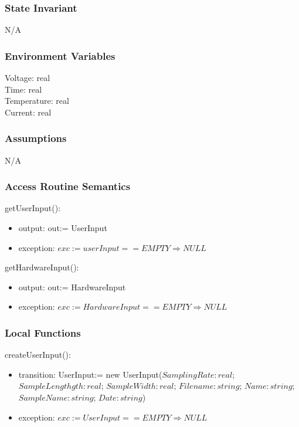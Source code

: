 \documentclass[12pt, titlepage]{article}
\begin{document}
\subsubsection{State Invariant}

N/A

\subsubsection{Environment Variables}
Voltage: real \\
Time: real \\
Temperature: real \\
Current: real 


\subsubsection{Assumptions}
N/A

\subsubsection{Access Routine Semantics}

\noindent getUserInput():
\begin{itemize}
\item output: out:= UserInput
\item exception: $exc:= userInput == EMPTY \Rightarrow NULL$
\end{itemize}

\noindent getHardwareInput():
\begin{itemize}
  \item output: out:= HardwareInput
  \item exception: $exc:= HardwareInput == EMPTY \Rightarrow NULL$
\end{itemize}

\subsubsection{Local Functions}

createUserInput(): 
\begin{itemize}
  \item transition: UserInput:= new UserInput($SamplingRate: real$; $SampleLengthgth: real$; $SampleWidth: real$; $Filename: string$; $Name: string$; $SampleName: string$; $Date: string$)
  \item exception: $exc:= UserInput == EMPTY \Rightarrow NULL$
\end{itemize}
\end{document}
